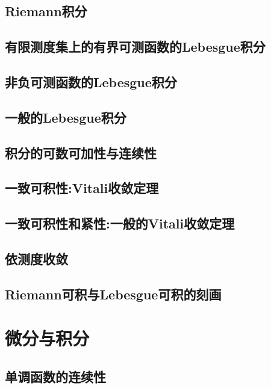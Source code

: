 \documentclass[lang=cn,newtx,10pt,scheme=chinese]{../Template/elegantbook}
\begin{document}
\section{Riemann积分}

\section{有限测度集上的有界可测函数的Lebesgue积分}

\section{非负可测函数的Lebesgue积分}

\section{一般的Lebesgue积分}

\section{积分的可数可加性与连续性}

\section{一致可积性:Vitali收敛定理}

\section{一致可积性和紧性:一般的Vitali收敛定理}

\section{依测度收敛}

\section{Riemann可积与Lebesgue可积的刻画}






\chapter{微分与积分}


\section{单调函数的连续性}
\end{document}

